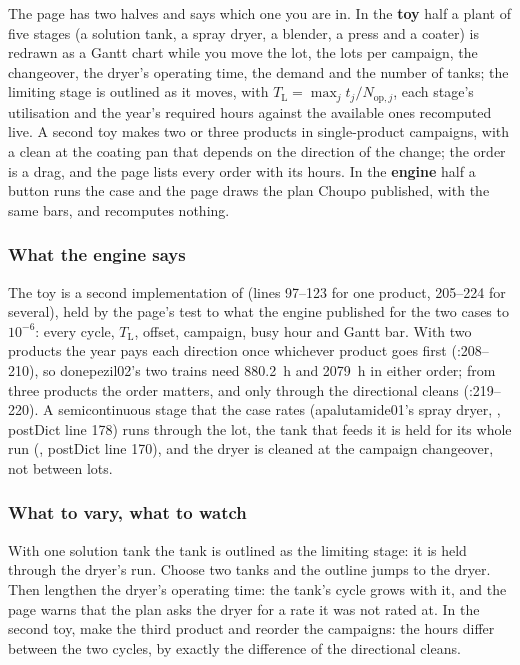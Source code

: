\documentclass[11pt,a4paper]{article}
\begin{document}
The page has two halves and says which one you are in.  In the \textbf{toy}
half a plant of five stages (a solution tank, a spray dryer, a blender, a
press and a coater) is redrawn as a Gantt chart while you move the lot, the
lots per campaign, the changeover, the dryer's operating time, the demand and
the number of tanks; the limiting stage is outlined as it moves, with
$T_{\mathrm{L}}=\max_j t_j/N_{\mathrm{op},j}$, each stage's utilisation and the
year's required hours against the available ones recomputed live.  A second toy
makes two or three products in single-product campaigns, with a clean at the
coating pan that depends on the direction of the change; the order is a drag,
and the page lists every order with its hours.  In the \textbf{engine} half a
button runs the case and the page draws the plan Choupo published, with the
same bars, and recomputes nothing.

\subsubsection*{What the engine says}

The toy is a second implementation of  (lines 97--123
for one product, 205--224 for several), held by the page's test to what the
engine published for the two cases to $10^{-6}$: every cycle, $T_{\mathrm{L}}$,
offset, campaign, busy hour and Gantt bar.  With two products the year
pays each direction once whichever product goes first (:208--210),
so donepezil02's two trains need 880.2~h and 2079~h in either order; from three
products the order matters, and only through the directional cleans
(:219--220).  A semicontinuous stage that the case rates
(apalutamide01's spray dryer, , postDict
line 178) runs through the lot, the tank that feeds it is held for its whole
run (, postDict line 170), and the dryer is
cleaned at the campaign changeover, not between lots.

\subsubsection*{What to vary, what to watch}

\begin{tryit}
With one solution tank the tank is outlined as the limiting stage: it is held
through the dryer's run.  Choose two tanks and the outline jumps to the dryer.
Then lengthen the dryer's operating time: the tank's cycle grows with it, and
the page warns that the plan asks the dryer for a rate it was not rated at.  In
the second toy, make the third product and reorder the campaigns: the hours
differ between the two cycles, by exactly the difference of the directional
cleans.
\end{tryit}
\end{document}
